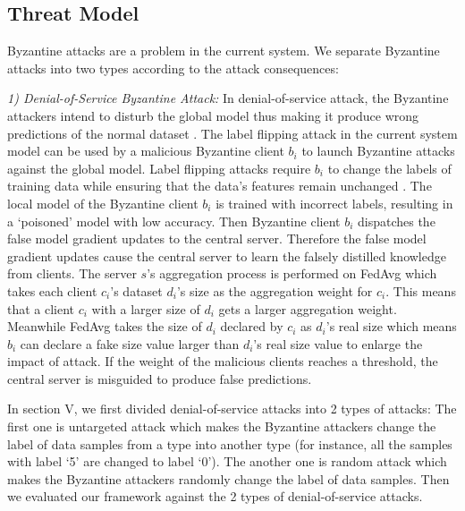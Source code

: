 \documentclass[lettersize,journal]{IEEEtran}
\begin{document}
\subsection{Threat Model}
Byzantine attacks are a problem in the current system. We separate Byzantine attacks into two types according to the attack consequences:
\par \textit{1) Denial-of-Service Byzantine Attack:} In denial-of-service attack, the Byzantine attackers intend to disturb the global model thus making it produce wrong predictions of the normal dataset \cite{ref_04_model,ref_06_model,ref_07_data,yang2017generative,sun2018data}. The label flipping attack in the current system model can be used by a malicious Byzantine client $b_i$ to launch Byzantine attacks against the global model. Label flipping attacks require $b_i$ to change the labels of training data while ensuring that the data's features remain unchanged \cite{ref_18_label_flipping}. The local model of the Byzantine client $b_i$ is trained with incorrect labels, resulting in a `poisoned' model with low accuracy. Then Byzantine client $b_{i}$ dispatches the false model gradient updates to the central server. Therefore the false model gradient updates cause the central server to learn the falsely distilled knowledge from clients. The server $s$'s aggregation process is performed on FedAvg which takes each client $c_{i}$'s dataset $d_{i}$'s size as the aggregation weight for $c_{i}$. This means that a client $c_{i}$ with a larger size of $d_{i}$ gets a larger aggregation weight. Meanwhile FedAvg takes the size of $d_{i}$ declared by $c_{i}$ as $d_{i}$'s real size which means $b_{i}$ can declare a fake size value larger than $d_{i}$'s real size value to enlarge the impact of attack. If the weight of the malicious clients reaches a threshold, the central server is misguided to produce false predictions. 
\par In section V, we first divided denial-of-service attacks into 2 types of attacks: The first one is untargeted attack which makes the Byzantine attackers change the label of data samples from a type into another type (for instance, all the samples with label `5' are changed to label `0'). The another one is random attack which makes the Byzantine attackers randomly change the label of data samples. Then we evaluated our framework against the 2 types of denial-of-service attacks.
\end{document}
